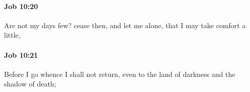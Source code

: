 		\paragraph{Job 10:20} %
			\label{JOB-10-20}

			Are not my days few? cease then, and let me alone, that I may take comfort a little,


		\paragraph{Job 10:21} %
			\label{JOB-10-21}

			Before I go whence I shall not return, even to the land of darkness and the shadow of death;


